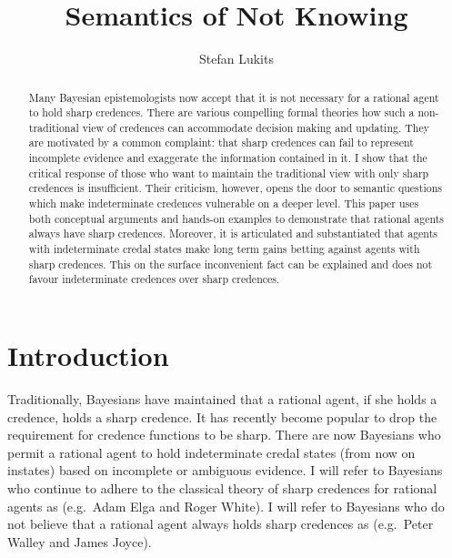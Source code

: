 \documentclass[11pt]{article}
\begin{document}

\title{Semantics of Not Knowing}
\author{Stefan Lukits}
\date{}
\maketitle
{}

\begin{abstract}
  {\noindent}Many Bayesian epistemologists now accept that it is not necessary for
a rational agent to hold sharp credences. There are various compelling
formal theories how such a non-traditional view of credences can
accommodate decision making and updating. They are motivated by a
common complaint: that sharp credences can fail to represent
incomplete evidence and exaggerate the information contained in it. I
show that the critical response of those who want to maintain the
traditional view with only sharp credences is insufficient. Their
criticism, however, opens the door to semantic questions which make
indeterminate credences vulnerable on a deeper level. This paper uses
both conceptual arguments and hands-on examples to demonstrate that
rational agents always have sharp credences. Moreover, it is
articulated and substantiated that agents with indeterminate credal
states make long term gains betting against agents with sharp
credences. This on the surface inconvenient fact can be explained and
does not favour indeterminate credences over sharp credences.
\end{abstract}

\section{Introduction}
\label{Introduction}

Traditionally, Bayesians have maintained that a rational agent, if she
holds a credence, holds a sharp credence. It has recently become
popular to drop the requirement for credence functions to be sharp.
There are now Bayesians who permit a rational agent to hold
indeterminate credal states (from now on instates) based on incomplete
or ambiguous evidence. I will refer to Bayesians who continue to
adhere to the classical theory of sharp credences for rational agents
as  (e.g.\ Adam Elga and Roger White). I will refer
to Bayesians who do not believe that a rational agent always holds
sharp credences as  (e.g.\ Peter Walley and James
Joyce).
\end{document}
